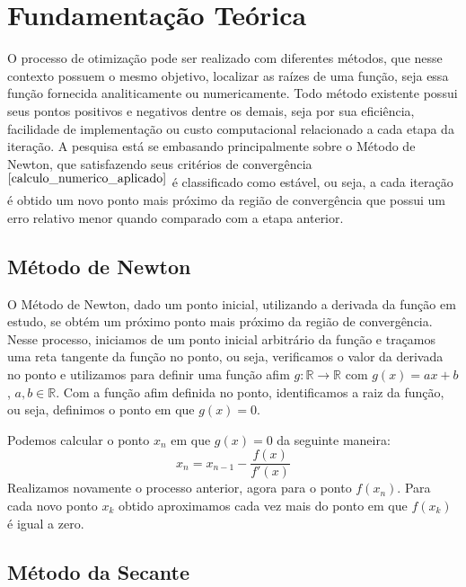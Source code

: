 \section{Fundamentação Teórica}
  O processo de otimização pode ser realizado com diferentes métodos, que nesse contexto possuem o mesmo objetivo, localizar as raízes de uma função, seja essa função fornecida analiticamente ou numericamente. Todo método existente possui seus pontos positivos e negativos dentre os demais, seja por sua eficiência, facilidade de implementação ou custo computacional relacionado a cada etapa da iteração. A pesquisa está se embasando principalmente sobre o Método de Newton, que satisfazendo seus critérios de convergência$^{ \cite{calculo_numerico_aplicado} }$ é classificado como estável, ou seja, a cada iteração é obtido um novo ponto mais próximo da região de convergência que possui um erro relativo menor quando comparado com a etapa anterior.

\subsection{Método de Newton}
\label{sec:newton-method}

O Método de Newton, dado um ponto inicial, utilizando a derivada da função em estudo, se obtém um próximo ponto mais próximo da região de convergência. Nesse processo, iniciamos de um ponto inicial arbitrário da função e traçamos uma reta tangente da função no ponto, ou seja, verificamos o valor da derivada no ponto e utilizamos para definir uma função afim $g: {\mathds{R}\to\mathds{R}}$ com $g(x) = ax + b$, $a, b \in \mathds{R}$. Com a função afim definida no ponto, identificamos a raiz da função, ou seja, definimos o ponto em que $g(x)=0$.

Podemos calcular o ponto $x_n$ em que $g(x) = 0$ da seguinte maneira:
%
\begin{equation}
  x_n = x_{n-1} - \frac{f(x)}{f'(x)}
\end{equation}
%
Realizamos novamente o processo anterior, agora para o ponto $f(x_n)$. Para cada novo ponto $x_k$ obtido aproximamos cada vez mais do ponto em que $f(x_k)$ é igual a zero.


\subsection{Método da Secante}

